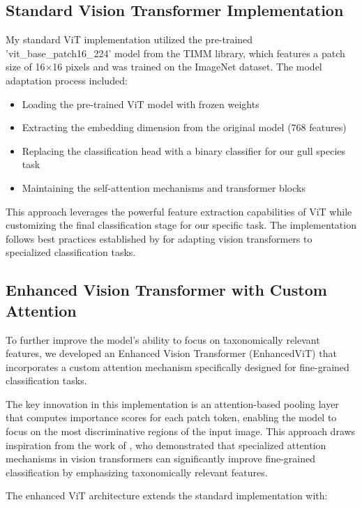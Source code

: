 \subsection{Standard Vision Transformer Implementation}

My standard ViT implementation utilized the pre-trained 'vit\_base\_patch16\_224' model from the TIMM library, which features a patch size of 16$\times$16 pixels and was trained on the ImageNet dataset. The model adaptation process included:

\begin{itemize}
    \item Loading the pre-trained ViT model with frozen weights
    \item Extracting the embedding dimension from the original model (768 features)
    \item Replacing the classification head with a binary classifier for our gull species task
    \item Maintaining the self-attention mechanisms and transformer blocks
\end{itemize}

This approach leverages the powerful feature extraction capabilities of ViT while customizing the final classification stage for our specific task. The implementation follows best practices established by \citep{wightman2021resnet} for adapting vision transformers to specialized classification tasks.

\subsection{Enhanced Vision Transformer with Custom Attention}

To further improve the model's ability to focus on taxonomically relevant features, we developed an Enhanced Vision Transformer (EnhancedViT) that incorporates a custom attention mechanism specifically designed for fine-grained classification tasks.

The key innovation in this implementation is an attention-based pooling layer that computes importance scores for each patch token, enabling the model to focus on the most discriminative regions of the input image. This approach draws inspiration from the work of \citep{guan2022attention}, who demonstrated that specialized attention mechanisms in vision transformers can significantly improve fine-grained classification by emphasizing taxonomically relevant features.

The enhanced ViT architecture extends the standard implementation with:

